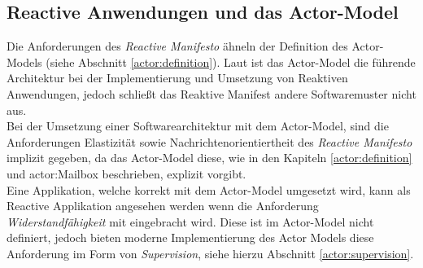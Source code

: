 \subsection{Reactive Anwendungen und das Actor-Model}
Die Anforderungen des \textit{Reactive Manifesto} ähneln der Definition des Actor-Models (siehe Abschnitt \ref{actor:definition}). Laut \cite{Vernon2015ReactiveAkka} ist das Actor-Model die führende Architektur bei der Implementierung und Umsetzung von Reaktiven Anwendungen, jedoch schließt das Reaktive Manifest andere Softwaremuster nicht aus. \\
Bei der Umsetzung einer Softwarearchitektur mit dem Actor-Model, sind die Anforderungen  Elastizität sowie  Nachrichtenorientiertheit des \textit{Reactive Manifesto} implizit gegeben, da das Actor-Model diese, wie in den Kapiteln \ref{actor:definition} und    {actor:Mailbox} beschrieben, explizit vorgibt.\\Eine Applikation, welche korrekt mit dem Actor-Model umgesetzt wird, kann als Reactive Applikation angesehen werden wenn die Anforderung \textit{Widerstandfähigkeit} mit eingebracht wird. Diese ist im Actor-Model nicht definiert, jedoch bieten moderne Implementierung des Actor Models diese Anforderung im Form von \textit{Supervision}, siehe hierzu Abschnitt \ref{actor:supervision}.

